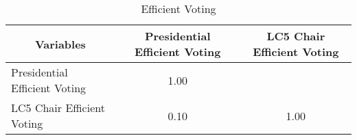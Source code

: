 \begin{table}[htbp]\centering \caption{Efficient Voting\label{corrtable}}
\begin{tabular}{l  c  c }\hline\hline
\multicolumn{1}{c}{Variables} &Presidential Efficient Voting&LC5 Chair Efficient Voting\\ \hline
Presidential Efficient Voting&1.00\\
LC5 Chair Efficient Voting&0.10&1.00\\
\hline \hline 
 \end{tabular}
\end{table}
